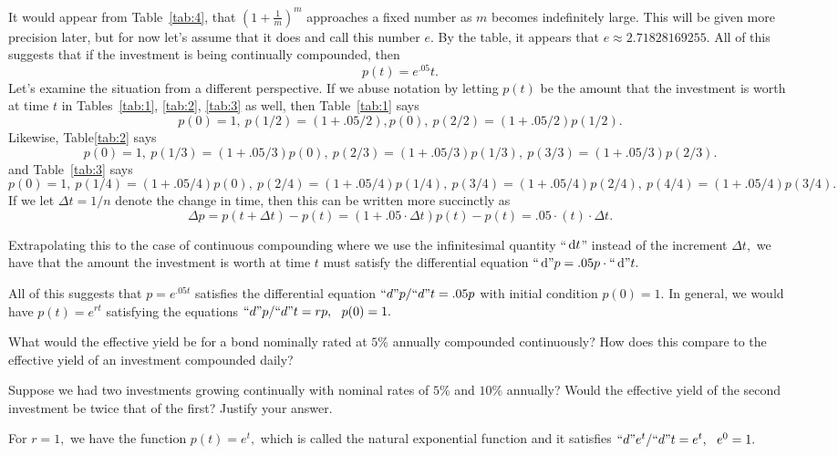 It would appear from Table~\ref{tab:4}, that $(1+\frac{1}{m})^m$ approaches a fixed number
as $m$ becomes indefinitely large.  This will be given more precision
later, but for now let's assume that it does and call this number $e.$ 
By the table, it appears that $e\approx{}2.71828169255.$  All of this suggests
that if the investment is being continually compounded, then
$$
p(t)=e^.05t.
$$
Let's examine the situation from a different perspective. If we abuse
notation by letting $p(t)$ be the amount that the investment is worth
at time $t$ in Tables~\ref{tab:1}, \ref{tab:2}, \ref{tab:3} as well,
then Table~\ref{tab:1} says
$$
p(0)=1,\ p(1/2)=(1+.05/2),p(0), \ p(2/2)=(1+.05/2)p(1/2).
$$
Likewise, Table\ref{tab:2} says 
$$
p(0)=1,\ p(1/3)=(1+.05/3)p(0),\ p(2/3)=(1+.05/3)p(1/3),\ p(3/3)=(1+.05/3)p(2/3). 
$$
and Table~\ref{tab:3} says 
$$
p(0)=1,\ p(1/4)=(1+.05/4)p(0),\ p(2/4)=(1+.05/4)p(1/4),\ p(3/4)=(1+.05/4)p(2/4),\ p(4/4)=(1+.05/4)p(3/4).  
$$
If we let $\Delta t=1/n$ denote the change in time, then this can be
written more succinctly as 
$$
\Delta p=p(t+ \Delta t)-p(t)=(1+.05\cdot\Delta
t)p(t)-p(t)=.05\cdotp(t)\cdot\Delta t.
$$

Extrapolating this to the case of continuous compounding where we use
the infinitesimal quantity ``$\thinspace{\rm d}t$'' instead of the increment $\Delta t,$ we have
that the amount the investment is worth at time $t$ must satisfy the
differential equation $``\thinspace{\rm d}" p=.05p\cdot ``\thinspace{\rm d}" t.$

All of this suggests that $p=e^{.05t}$ satisfies the differential
equation $``d" p/``d" t=.05p$ with initial condition $p(0)=1.$  In
general, we would have $p(t)=e^{rt}$ satisfying the equations $``d" p/``d"
t=rp,\ \ p(0)=1.$

\begin{embeddedproblem}{}
  What would the effective yield be for a bond nominally rated at
  $5\%$ annually compounded continuously?  How does this compare to
  the effective yield of an investment compounded daily?
\end{embeddedproblem}

\begin{embeddedproblem}{}
  Suppose we had two investments growing continually with nominal
  rates of $5\%$ and $10\%$ annually?  Would the effective yield of
  the second investment be twice that of the first?  Justify your
  answer.
\end{embeddedproblem}

For $r=1,$ we have the function $p(t)=e^t,$ which is called the
natural exponential function and it satisfies $``d" e^t /``d" t=e^t,\
\ e^0=1.$

